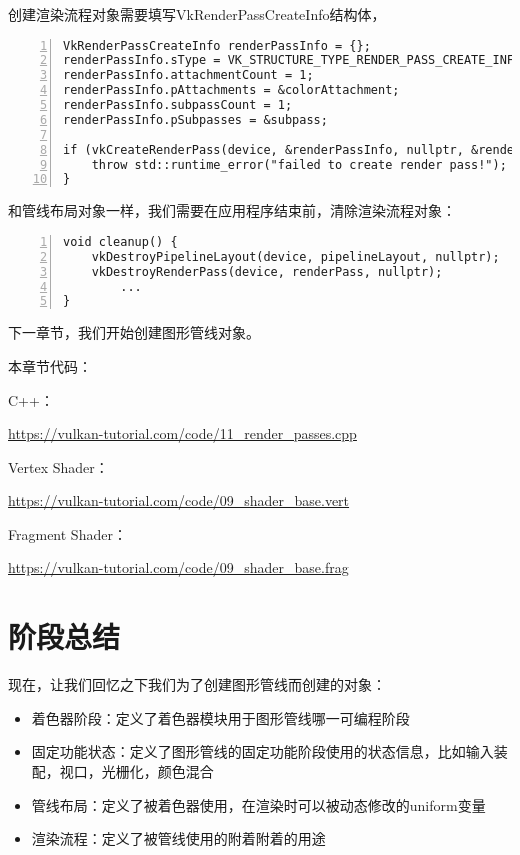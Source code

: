 \documentclass{ctexart}
\begin{document}
创建渲染流程对象需要填写VkRenderPassCreateInfo结构体，

\begin{lstlisting}[language={[ANSI]C},keywordstyle=\color{blue!70},commentstyle=\color{red!50!green!50!blue!50},frame=shadowbox, rulesepcolor=\color{red!20!green!20!blue!20},basicstyle=\small,numbers=left, numberstyle=\tiny,breaklines=true]
VkRenderPassCreateInfo renderPassInfo = {};
renderPassInfo.sType = VK_STRUCTURE_TYPE_RENDER_PASS_CREATE_INFO;
renderPassInfo.attachmentCount = 1;
renderPassInfo.pAttachments = &colorAttachment;
renderPassInfo.subpassCount = 1;
renderPassInfo.pSubpasses = &subpass;

if (vkCreateRenderPass(device, &renderPassInfo, nullptr, &renderPass) != VK_SUCCESS) {
	throw std::runtime_error("failed to create render pass!");
}
\end{lstlisting}

和管线布局对象一样，我们需要在应用程序结束前，清除渲染流程对象：

\begin{lstlisting}[language={[ANSI]C},keywordstyle=\color{blue!70},commentstyle=\color{red!50!green!50!blue!50},frame=shadowbox, rulesepcolor=\color{red!20!green!20!blue!20},basicstyle=\small,numbers=left, numberstyle=\tiny,breaklines=true]
void cleanup() {
	vkDestroyPipelineLayout(device, pipelineLayout, nullptr);
	vkDestroyRenderPass(device, renderPass, nullptr);
		...
}
\end{lstlisting}

下一章节，我们开始创建图形管线对象。

本章节代码：

C++：

\url{https://vulkan-tutorial.com/code/11_render_passes.cpp}

Vertex Shader：

\url{https://vulkan-tutorial.com/code/09_shader_base.vert}

Fragment Shader：

\url{https://vulkan-tutorial.com/code/09_shader_base.frag}

\newpage
\section{阶段总结}

现在，让我们回忆之下我们为了创建图形管线而创建的对象：

\begin{itemize}
	\item 着色器阶段：定义了着色器模块用于图形管线哪一可编程阶段
	\item 固定功能状态：定义了图形管线的固定功能阶段使用的状态信息，比如输入装配，视口，光栅化，颜色混合
	\item 管线布局：定义了被着色器使用，在渲染时可以被动态修改的uniform变量
	\item 渲染流程：定义了被管线使用的附着附着的用途
\end{itemize}
\end{document}
